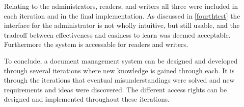 \documentclass[../master.tex]{subfiles}
\begin{document}
Relating to the administrators, readers, and writers all three were included in each iteration and in the final implementation.
As discussed in \cref{fourthtest} the interface for the administrator is not wholly intuitive, but still usable, and the tradeoff between effectiveness and easiness to learn was deemed acceptable.
Furthermore the system is accessable for readers and writers.

To conclude, a document management system can be designed and developed through several iterations where new knowledge is gained through each.
It is through the iterations that eventual misunderstandings were solved and new requirements and ideas were discovered.
The different access rights can be designed and implemented throughout these iterations.
\end{document}
